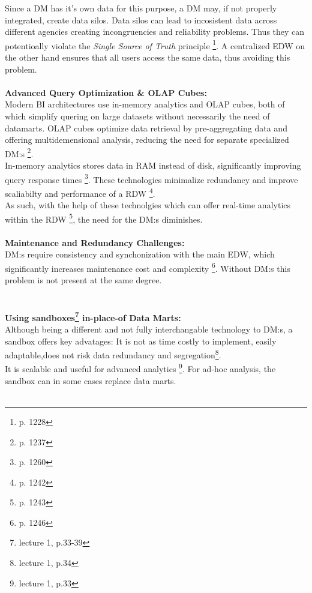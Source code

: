 Since a DM has it's own data for this purpose, a DM may, if not properly integrated, create data silos.
Data silos can lead to incosistent data across different agencies creating incongruencies and reliability problems.
Thus they can potentioally violate the \textit{Single Source of Truth} principle \footnote{p. 1228}.
A centralized EDW on the other hand ensures that all users access the same data, thus avoiding this problem.
\\\\
\textbf{Advanced Query Optimization \& OLAP Cubes:}\\
Modern BI architectures use in-memory analytics and OLAP cubes, both of which simplify quering on large datasets without necessarily the need of datamarts.
OLAP cubes optimize data retrieval by pre-aggregating data and offering multidemensional analysis, reducing the need for separate specialized DM:s \footnote{p. 1237}.\\
In-memory analytics stores data in RAM instead of disk, significantly improving query response times \footnote{p. 1260}.
These technologies minimalize redundancy and improve scaliabilty and performance of a RDW \footnote{p. 1242}.
\\ As such, with the help of these technolgies which can offer real-time analytics within the RDW \footnote{p. 1243}, the need for the DM:s diminishes.
\\\\\textbf{Maintenance and Redundancy Challenges:}\\
DM:s require consistency and synchonization with the main EDW, which significantly increases maintenance cost and complexity \footnote{p. 1246}.
Without DM:s this problem is not present at the same degree.
\\\\\textbf{\color{red}{MOVE THIS PART BELOW AWAY FROM HERE TO SANDBOX PART? THEY ARE DIFFERENT FROM DATAMARTS, ALTHOUGH THEY CAN COMPLIMENT THEM. HARD TO MOTIVATE...}}
\\\textbf{Using sandboxes\footnote{lecture 1, p.33-39} in-place-of Data Marts:}\\
Although being a different and not fully interchangable technology to DM:s, a sandbox offers key advatages:
It is not as time costly to implement, easily adaptable,does not risk data redundancy and segregation\footnote{lecture 1, p.34}.\\
It is scalable and useful for advanced analytics \footnote{lecture 1, p.33}.
For ad-hoc analysis, the sandbox can in some cases replace data marts.\\\\

